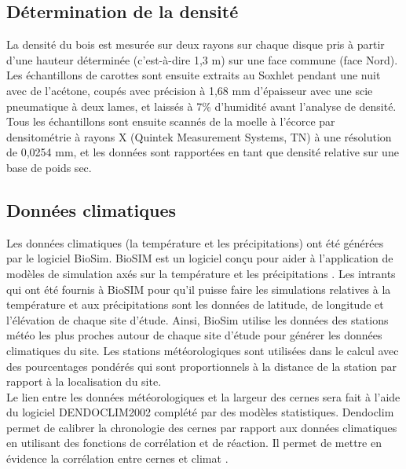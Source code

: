 \documentclass{report}
\begin{document}

\subsection*{Détermination de la densité}
La densité du bois est mesurée sur deux rayons sur chaque disque pris à partir d'une hauteur déterminée (c'est-à-dire 1,3 m) sur une face commune (face Nord). Les échantillons de carottes sont ensuite extraits au Soxhlet pendant une nuit avec de l'acétone, coupés avec précision à 1,68 mm d'épaisseur avec une scie pneumatique à deux lames, et laissés à 7\% d'humidité avant l'analyse de densité. 
Tous les échantillons sont ensuite scannés de la moelle à l'écorce par densitométrie à rayons X (Quintek Measurement Systems, TN) à une résolution de 0,0254 mm, et les données sont rapportées en tant que densité relative sur une base de poids sec. %

\subsection*{Données climatiques}
Les données climatiques (la température et les précipitations) ont été générées par le logiciel BioSim. BioSIM est un logiciel conçu pour aider à l'application de modèles de simulation axés sur la température et les précipitations \citep{Regniere2014}. Les intrants qui ont été fournis à BioSIM pour qu'il puisse faire les simulations relatives à la température et aux précipitations sont les données de latitude, de longitude et l'élévation de chaque site d'étude. Ainsi, BioSim utilise les données des stations météo les plus proches autour de chaque site d'étude pour générer les données climatiques du site. 
Les stations météorologiques sont utilisées dans le calcul avec des pourcentages pondérés qui sont proportionnels à la distance de la station par rapport à la localisation du site.\\ 

Le lien entre les données météorologiques et la largeur des cernes sera fait à l'aide du logiciel DENDOCLIM2002 complété par des modèles statistiques. Dendoclim permet de calibrer la chronologie des cernes par rapport aux données climatiques en utilisant des fonctions de corrélation et de réaction. Il permet de mettre en évidence la corrélation entre cernes et climat \citep{Biondi2004}. 
\end{document}
